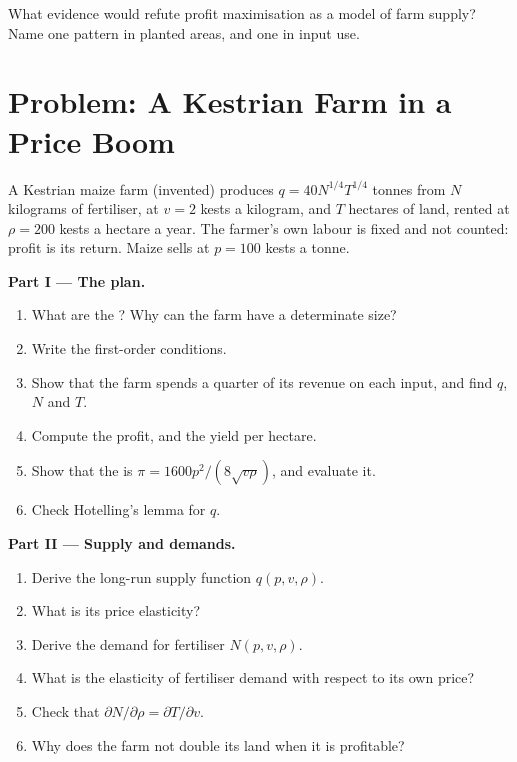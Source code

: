 \begin{exercise}[$\star\star\star$]\label{exo:b1:profit-maximisation:refute}
What evidence would refute profit maximisation as a model of farm supply?
Name one pattern in planted areas, and one in input use.
\end{exercise}

\section{Problem: A Kestrian Farm in a Price Boom}\label{sec:b1:profit-maximisation:problem}

\begin{problem}\label{pb:b1:profit-maximisation:farm}
A Kestrian maize farm (invented) produces $q = 40N^{1/4}T^{1/4}$ tonnes from $N$
kilograms of fertiliser, at $v = 2$ kests a kilogram, and $T$ hectares of land,
rented at $\rho = 200$ kests a hectare a year. The farmer's own labour is fixed
and not counted: profit is its return. Maize sells at $p = 100$ kests a tonne.

\medskip\noindent\textbf{Part I --- The plan.}
\begin{enumerate}
  \item What are the ? Why can the farm have a determinate size?
  \item Write the first-order conditions.
  \item Show that the farm spends a quarter of its revenue on each input, and find $q$, $N$ and $T$.
  \item Compute the profit, and the yield per hectare.
  \item Show that the  is $\pi = 1600p^2/(8\sqrt{v\rho})$, and evaluate it.
  \item Check Hotelling's lemma for $q$.
\end{enumerate}

\medskip\noindent\textbf{Part II --- Supply and demands.}
\begin{enumerate}[resume]
  \item Derive the long-run supply function $q(p, v, \rho)$.
  \item What is its price elasticity?
  \item Derive the demand for fertiliser $N(p, v, \rho)$.
  \item What is the elasticity of fertiliser demand with respect to its own price?
  \item Check that $\partial N/\partial\rho = \partial T/\partial v$.
  \item Why does the farm not double its land when it is profitable?
\end{enumerate}


\end{problem}

